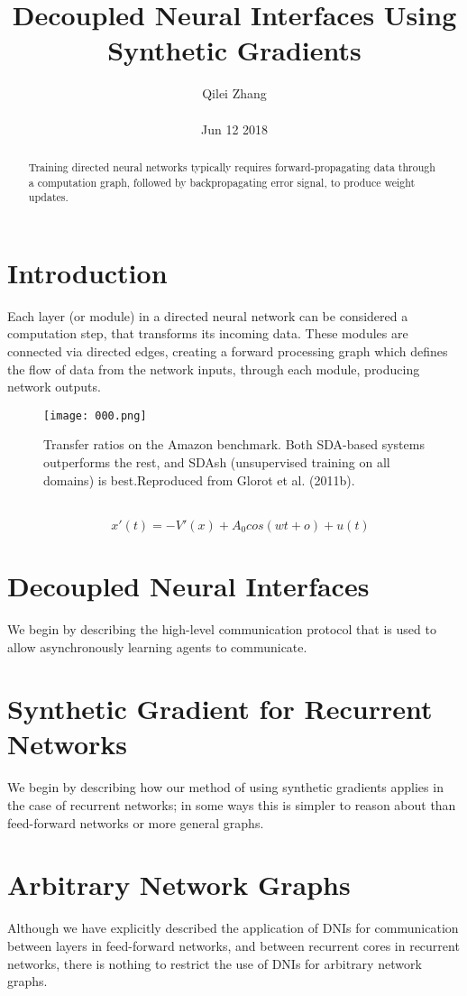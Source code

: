 \documentclass[30pt,twocolumn,letterpaper]{article}
\author{Qilei Zhang\\\\
Jun 12 2018}
\title{Decoupled Neural Interfaces Using Synthetic Gradients}
\begin{document}
\maketitle
\begin{abstract}
  Training directed neural networks typically requires forward-propagating data through a computation graph, followed by backpropagating error signal, to produce weight updates.
\end{abstract}
\section{Introduction}
Each layer (or module) in a directed neural network can be considered a computation step, that transforms its incoming data. These modules are connected via directed edges, creating a forward processing graph which defines the flow of data from the network inputs, through each module, producing network outputs\cite{Barat2016String}. \\
\begin{figure}[htbp]
\small
\centering
\texttt{[image: 000.png]}
\caption{Transfer ratios on the Amazon benchmark. Both SDA-based systems outperforms the rest, and SDAsh (unsupervised training on all domains) is best.Reproduced from Glorot et al. (2011b).}
\label{fig:lable}
\end{figure}\\
\begin{equation}
\quad x'(t)=-V'(x)+A_0cos(wt+o)+u(t)
\end{equation}
\section{Decoupled Neural Interfaces}
We begin by describing the high-level communication protocol that is used to allow asynchronously learning agents to communicate\cite{Eiber2013Attaining}.\\
\section{Synthetic Gradient for Recurrent Networks}
We begin by describing how our method of using synthetic gradients applies in the case of recurrent networks; in some ways this is simpler to reason about than feed-forward networks or more general graphs\cite{Liu2005Aeroengine}.
\section{Arbitrary Network Graphs}
Although we have explicitly described the application of DNIs for communication between layers in feed-forward networks\cite{Mahendran2015Visualizing}, and between recurrent cores in recurrent networks, there is nothing to restrict the use of DNIs for arbitrary network graphs\cite{Yi2010Effective}.
{\small


}
\end{document}
